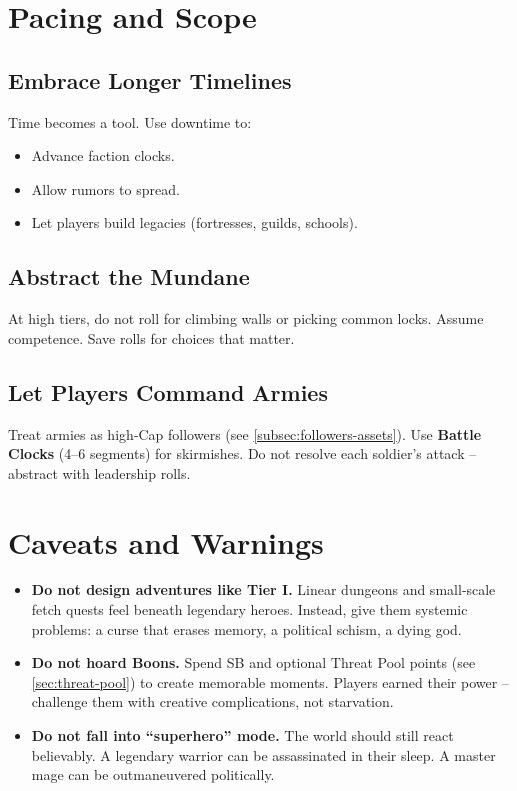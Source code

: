 \section{Pacing and Scope}

\subsection*{Embrace Longer Timelines}
Time becomes a tool. Use downtime to:
\begin{itemize}
  \item Advance faction clocks.
  \item Allow rumors to spread.
  \item Let players build legacies (fortresses, guilds, schools).
\end{itemize}

\subsection*{Abstract the Mundane}
At high tiers, do not roll for climbing walls or picking common locks. Assume competence. Save rolls for choices that matter.

\subsection*{Let Players Command Armies}
Treat armies as high‑Cap followers (see \ref{subsec:followers-assets}). Use \textbf{Battle Clocks} (4–6 segments) for skirmishes. Do not resolve each soldier’s attack – abstract with leadership rolls.

\section{Caveats and Warnings}

\begin{itemize}
  \item \textbf{Do not design adventures like Tier I.} Linear dungeons and small‑scale fetch quests feel beneath legendary heroes. Instead, give them systemic problems: a curse that erases memory, a political schism, a dying god.
  \item \textbf{Do not hoard Boons.} Spend SB and optional Threat Pool points (see \ref{sec:threat-pool}) to create memorable moments. Players earned their power – challenge them with creative complications, not starvation.
  \item \textbf{Do not fall into “superhero” mode.} The world should still react believably. A legendary warrior can be assassinated in their sleep. A master mage can be outmaneuvered politically.
\end{itemize}

